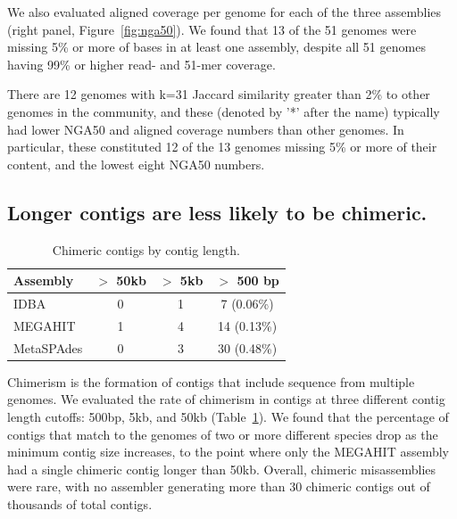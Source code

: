 \documentclass[11pt]{article}
\begin{document}
We also evaluated aligned coverage per genome for each of the three
assemblies (right panel, Figure~\ref{fig:nga50}).  We found that 13
of the 51 genomes were missing 5\% or more of bases in at least one
assembly, despite all 51 genomes having 99\% or higher read- and
51-mer coverage.

There are 12 genomes with k=31 Jaccard similarity greater than 2\% to
other genomes in the community, and these (denoted by '*' after the
name) typically had lower NGA50 and aligned coverage numbers than
other genomes.  In particular, these constituted 12 of the 13 genomes
missing 5\% or more of their content, and the lowest eight NGA50 numbers.

\subsection*{Longer contigs are less likely to be chimeric.}

\begin{table}[!h]
\centering
\caption{Chimeric contigs by contig length.}
\begin{tabular}{|l|c|c|c|}\hline
\textbf{Assembly} & \textbf {$>$ 50kb} & \textbf {$>$ 5kb} & \textbf{$>$ 500 bp}
\\ \hline

IDBA         & 0 & 1 & 7 (0.06\%) \\
MEGAHIT      & 1 & 4 & 14 (0.13\%) \\ 
MetaSPAdes       & 0 & 3 & 30 (0.48\%) \\
\hline

\end{tabular}
\label{table:contig-chimera}

\end{table}


Chimerism is the formation of contigs that include sequence from
multiple genomes.  We evaluated the rate of chimerism in contigs at
three different contig length cutoffs: 500bp, 5kb, and 50kb
(Table~\ref{table:contig-chimera}).  We found that the percentage of
contigs that match to the genomes of two or more different species
drop as the minimum contig size increases, to the point where only the
MEGAHIT assembly had a single chimeric contig longer than 50kb.
Overall, chimeric misassemblies were rare, with no assembler
generating more than 30 chimeric contigs out of thousands of total
contigs.
\end{document}
